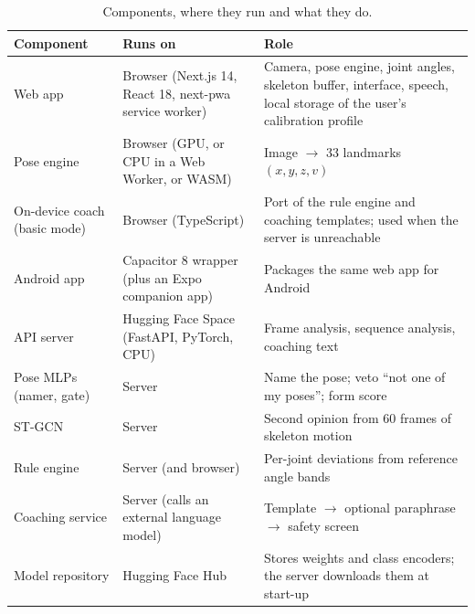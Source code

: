 \documentclass[11pt,a4paper]{article}
\begin{document}
\begin{table}[ht]
\centering\small
\caption{Components, where they run and what they do.}\label{tab:components}
\begin{tabularx}{\textwidth}{@{}L{3.2cm}L{3.0cm}Y@{}}
\toprule
Component & Runs on & Role \\ \midrule
Web app & Browser (Next.js 14, React 18, next-pwa service worker) & Camera, pose engine, joint angles, skeleton buffer, interface, speech, local storage of the user's calibration profile \\
Pose engine & Browser (GPU, or CPU in a Web Worker, or WASM) & Image $\to$ 33 landmarks $(x,y,z,v)$ \\
On-device coach (basic mode) & Browser (TypeScript) & Port of the rule engine and coaching templates; used when the server is unreachable \\
Android app & Capacitor 8 wrapper (plus an Expo companion app) & Packages the same web app for Android \\
API server & Hugging Face Space (FastAPI, PyTorch, CPU) & Frame analysis, sequence analysis, coaching text \\
Pose MLPs (namer, gate) & Server & Name the pose; veto ``not one of my poses''; form score \\
ST-GCN & Server & Second opinion from 60 frames of skeleton motion \\
Rule engine & Server (and browser) & Per-joint deviations from reference angle bands \\
Coaching service & Server (calls an external language model) & Template $\to$ optional paraphrase $\to$ safety screen \\
Model repository & Hugging Face Hub & Stores weights and class encoders; the server downloads them at start-up \\ \bottomrule
\end{tabularx}
\end{table}


\end{document}
